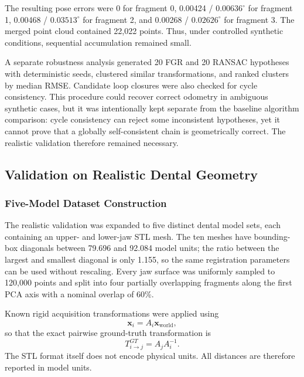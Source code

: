 The resulting pose errors were 0 for fragment 0, 0.00424 / $0.00636^\circ$ for fragment 1, 0.00468 / $0.03513^\circ$ for fragment 2, and 0.00268 / $0.02626^\circ$ for fragment 3. The merged point cloud contained 22,022 points. Thus, under controlled synthetic conditions, sequential accumulation remained small.

A separate robustness analysis generated 20 FGR and 20 RANSAC hypotheses with deterministic seeds, clustered similar transformations, and ranked clusters by median RMSE. Candidate loop closures were also checked for cycle consistency. This procedure could recover correct odometry in ambiguous synthetic cases, but it was intentionally kept separate from the baseline algorithm comparison: cycle consistency can reject some inconsistent hypotheses, yet it cannot prove that a globally self-consistent chain is geometrically correct. The realistic validation therefore remained necessary.

\subsection{Validation on Realistic Dental Geometry}
\label{sec:marvin-realistic-registration}

\subsubsection{Five-Model Dataset Construction}

The realistic validation was expanded to five distinct dental model sets, each containing an upper- and lower-jaw STL mesh. The ten meshes have bounding-box diagonals between 79.696 and 92.084 model units; the ratio between the largest and smallest diagonal is only 1.155, so the same registration parameters can be used without rescaling. Every jaw surface was uniformly sampled to 120,000 points and split into four partially overlapping fragments along the first PCA axis with a nominal overlap of 60\%.

Known rigid acquisition transformations were applied using
\begin{equation}
    \mathbf{x}_i = A_i \mathbf{x}_{\mathrm{world}},
\end{equation}
so that the exact pairwise ground-truth transformation is
\begin{equation}
    T_{i\rightarrow j}^{GT} = A_j A_i^{-1}.
\end{equation}
The STL format itself does not encode physical units. All distances are therefore reported in model units.

